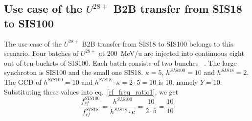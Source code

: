 
\subsection{Use case of the $U^{28+}$ B2B transfer from SIS18 to SIS100}
The use case of the $U^{28+}$ B2B transfer from SIS18 to SIS100 belongs to this scenario. Four batches of $U^{28+}$ at \SI{200}{MeV/\atomicmassunit} are injected into continuous eight out of ten buckets of SIS100. Each batch consists of two bunches ~\cite{liebermann_fair_2013, liebermann_sis100_2013}. The large synchroton is SIS100 and the small one SIS18. $\kappa=5$, $h^{\mathit{SIS100}}=10$ and $h^{\mathit{SIS18}}=2$. %
The GCD of $h^{\mathit{SIS100}}=10$ and $h^{\mathit{SIS18}} \cdot \kappa=2\cdot 5=10$ is 10, namely $Y=10$. Substituting these values into eq.~\ref{rf_freq_ratio1}, we get
\begin{equation}
\frac{f_{\mathit{rf}}^{\mathit{SIS100}}}{f_{\mathit{rf}}^{\mathit{SIS18}}}= \frac {h^{\mathit{SIS100}}}{h^{\mathit{SIS18}} \cdot \kappa}= \frac{10}{2 \cdot 5}=\frac{10}{10}
\end{equation}

